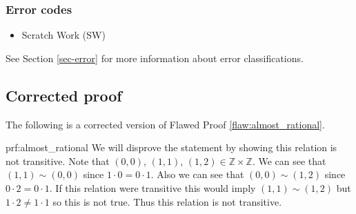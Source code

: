  
\subsubsection{Error codes}
\begin{itemize}
    \item Scratch Work (SW)
\end{itemize}
See Section \ref{sec-error} for more information about error classifications.

\clearpage
\subsection{Corrected proof}

The following is a corrected version of Flawed Proof \ref{flaw:almost_rational}. %

\begin{prf}{prf:almost_rational} %
We will disprove the statement by showing this relation is not transitive. Note that $(0,0)$, $(1,1)$, $(1,2) \in \mathbb{Z} \times \mathbb{Z}$. We can see that $(1,1) \sim (0,0)$ since $1 \cdot 0 = 0 \cdot 1$. Also we can see that $(0,0) \sim (1,2)$ since $0\cdot2 = 0\cdot1$. If this relation were transitive this would imply $(1,1) \sim (1,2)$ but $1\cdot 2 \neq 1 \cdot 1$ so this is not true. Thus this relation is not transitive. 
\end{prf}